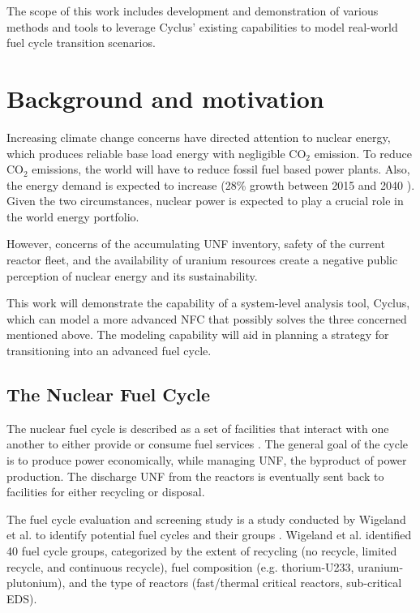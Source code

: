 The scope of this work includes development and demonstration of
various methods and tools to leverage Cyclus' existing
capabilities to model real-world fuel cycle transition scenarios.

\section{Background and motivation}
Increasing climate change concerns have directed attention
to nuclear energy, which produces reliable base load energy
with negligible CO$_2$ emission. To reduce CO$_2$ emissions,
the world will have to reduce fossil fuel based power plants.
Also, the energy demand is expected to increase
(28\% growth between 2015 and 2040 \cite{conti_international_2016}).
Given the two circumstances,
nuclear power is expected to play a crucial role in the world energy portfolio.

However, concerns of the accumulating \gls{UNF} inventory,
safety of the current reactor fleet, and the availability of
uranium resources create a negative public perception of
nuclear energy and its sustainability.

This work will demonstrate the capability of a system-level
analysis tool, Cyclus, which can model a more advanced \gls{NFC} that
possibly solves the three concerned mentioned above. The
modeling capability will aid in planning a strategy for
transitioning into an advanced fuel cycle.

\subsection{The Nuclear Fuel Cycle}
The nuclear fuel cycle is described as a set of facilities
that interact with one another to either provide or consume
fuel services \cite{gidden_agent-based_2015}. The general goal of
the cycle is to produce power economically, while managing
\gls{UNF}, the byproduct of power production. The discharge
\gls{UNF} from the reactors is eventually sent back to facilities for
either recycling or disposal. 


The fuel cycle evaluation and screening study is a study
conducted by Wigeland et al. to identify potential
fuel cycles and their groups \cite{wigeland_nuclear_2014}.
Wigeland et al. identified 40 fuel cycle groups, categorized by the extent of recycling
(no recycle, limited recycle, and continuous recycle), fuel composition
(e.g. thorium-U233, uranium-plutonium), and the type of reactors (fast/thermal critical
reactors, sub-critical \gls{EDS}).



